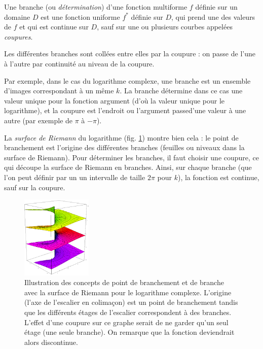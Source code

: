 \begin{mydef}[Branche]
    Une branche (ou \emph{détermination}) d'une fonction 
    multiforme $f$ définie sur un domaine $D$
    est une fonction uniforme $f^*$ définie sur $D$, qui prend une des valeurs
    de $f$ et qui est continue sur $D$, sauf sur une ou plusieurs courbes
    appelées \emph{coupures}.
\end{mydef}

Les différentes branches sont \og collées \fg entre elles par la coupure :
on \og passe \fg de l'une à l'autre par \og continuité \fg au niveau de la
coupure.

Par exemple, dans le cas du logarithme complexe, 
une branche est un ensemble d'images correspondant à un même $k$.
La branche détermine dans ce cas une valeur unique pour la fonction argument
(d'où la valeur unique pour le logarithme), et la coupure est l'endroit ou
l'argument \og passe\fg d'une valeur à une autre (par exemple de $\pi$ à $-\pi$).

La \emph{surface de Riemann} du logarithme (fig. \ref{fig:riemann-log})
montre bien cela : le point de branchement est \og l'origine \fg des différentes
branches (\og feuilles \fg ou \og niveaux \fg dans la surface de Riemann).
Pour déterminer les branches, il faut choisir une coupure, ce qui découpe la surface
de Riemann en branches. Ainsi, sur chaque branche (que l'on peut définir par un
un intervalle de taille $2\pi$ pour $k$), la fonction est continue, sauf sur la coupure.

\begin{figure}
	\centering
		\includegraphics[width=0.3\textwidth]{riemann_surface_log.jpg}
		\caption{Illustration des concepts de point de branchement et
		de branche avec la surface de Riemann pour le logarithme complexe.
		L'origine (l'axe de l'escalier en colimaçon) est un point de branchement
		tandis que les différents étages de l'escalier correspondent à des branches.
		L'effet d'une coupure sur ce graphe serait de ne garder qu'un seul étage
		(une seule branche). On remarque que la fonction deviendrait alors discontinue.}
		\label{fig:riemann-log}
\end{figure}

